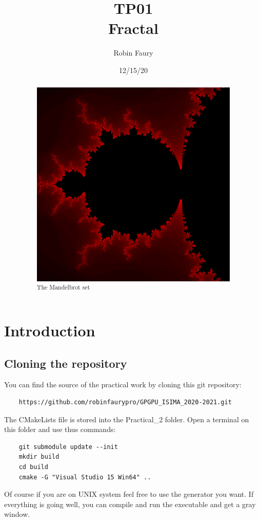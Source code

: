 \documentclass{article}
\begin{document}
\title{TP01\\Fractal}
\author{Robin Faury}
\date{12/15/20}
\maketitle

\begin{abstract}
	\begin{figure}[H]
		\centering
		\includegraphics[scale=0.4]{images/Mandelbrot.png}
		\caption{The Mandelbrot set}
	\end{figure}
\end{abstract}

\newpage
\section{Introduction}
\subsection{Cloning the repository}
You can find the source of the practical work by cloning this git repository:
\begin{lstlisting}
	https://github.com/robinfaurypro/GPGPU_ISIMA_2020-2021.git
\end{lstlisting}
The CMakeLists file is stored into the Practical\_2 folder. Open a terminal on this folder and use thus commands:
\begin{lstlisting}
	git submodule update --init
	mkdir build
	cd build
	cmake -G "Visual Studio 15 Win64" ..
\end{lstlisting}
Of course if you are on UNIX system feel free to use the generator you want.
If everything is going well, you can compile and run the executable and get a gray window.
\end{document}
